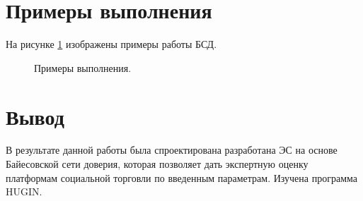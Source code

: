 	\section{Примеры выполнения}
	
	На рисунке \ref{examples} изображены примеры работы БСД.
	\begin{figure}[ht]
		\begin{minipage}[ht]{0.49\linewidth}
		\end{minipage}
		\hfill
		\begin{minipage}[ht]{0.49\linewidth}
		\end{minipage}
		\caption{Примеры выполнения.}
		\label{examples}  
	\end{figure}

	
	\section{Вывод}
		В результате данной работы была спроектирована разработана ЭС на основе Байесовской сети доверия, которая позволяет дать экспертную оценку платформам социальной торговли по введенным параметрам. Изучена программа HUGIN.